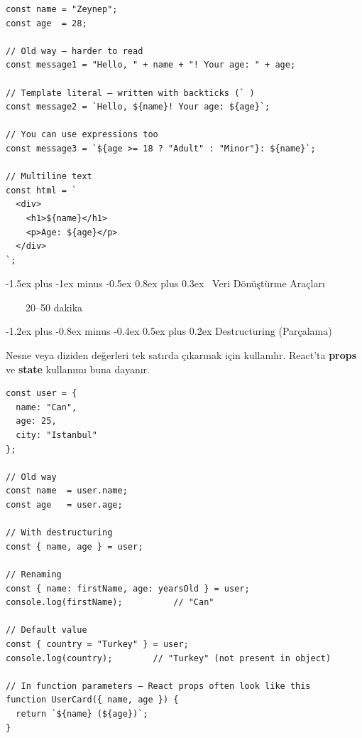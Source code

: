 \documentclass[12pt, a4paper]{article}
\makeatletter
\renewcommand{\section}{%
  \@startsection{section}{1}{\z@}%
    {-1.5ex plus -1ex minus -0.5ex}%
    {0.8ex plus 0.3ex}%
    {\normalfont\Large\bfseries\sffamily\color{primary}}%
}
\renewcommand{\subsection}{%
  \@startsection{subsection}{2}{\z@}%
    {-1.2ex plus -0.8ex minus -0.4ex}%
    {0.5ex plus 0.2ex}%
    {\normalfont\large\bfseries\sffamily\color{secondary}}%
}
\newcommand{\timebadge}[1]{%
  \noindent
  \colorbox{primary}{\color{white}\sffamily\bfseries\small\strut~~\faStopwatch~~#1~~}%
  \par\vspace{4pt}%
}
\makeatother
\begin{document}
\begin{tcolorbox}[enhanced, colback=codebg, colframe=gray!30,
    colbacktitle=primary!85!black, coltitle=white, arc=4pt,
    title={\sffamily\bfseries\small Template Literal Örneği}]
\begin{lstlisting}[style=jsstyle]
const name = "Zeynep";
const age  = 28;

// Old way — harder to read
const message1 = "Hello, " + name + "! Your age: " + age;

// Template literal — written with backticks (` )
const message2 = `Hello, ${name}! Your age: ${age}`;

// You can use expressions too
const message3 = `${age >= 18 ? "Adult" : "Minor"}: ${name}`;

// Multiline text
const html = `
  <div>
    <h1>${name}</h1>
    <p>Age: ${age}</p>
  </div>
`;
\end{lstlisting}
\end{tcolorbox}

\newpage
\section{\faTools\ Veri Dönüştürme Araçları}
\timebadge{20--50 dakika}

\subsection{Destructuring (Parçalama)}

Nesne veya diziden değerleri tek satırda çıkarmak için kullanılır.
React'ta \textbf{props} ve \textbf{state} kullanımı buna dayanır.

\vspace{6pt}

\begin{tcolorbox}[enhanced, colback=codebg, colframe=gray!30,
    colbacktitle=primary!85!black, coltitle=white, arc=4pt,
    title={\sffamily\bfseries\small Object Destructuring}]
\begin{lstlisting}[style=jsstyle]
const user = {
  name: "Can",
  age: 25,
  city: "Istanbul"
};

// Old way
const name  = user.name;
const age   = user.age;

// With destructuring
const { name, age } = user;

// Renaming
const { name: firstName, age: yearsOld } = user;
console.log(firstName);          // "Can"

// Default value
const { country = "Turkey" } = user;
console.log(country);        // "Turkey" (not present in object)

// In function parameters — React props often look like this
function UserCard({ name, age }) {
  return `${name} (${age})`;
}
\end{lstlisting}
\end{tcolorbox}
\end{document}
